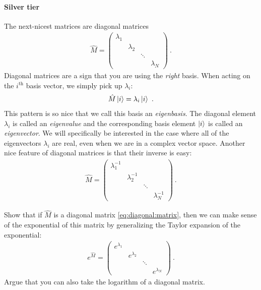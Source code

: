 \documentclass[12pt]{article}
\begin{document}
\paragraph{Silver tier} The next-nicest matrices are diagonal matrices
\begin{align}
\hat M = 
    \begin{pmatrix}
        \lambda_1 & & & \\
         & \lambda_2 & & \\
         & & \ddots & \\
         & & & \lambda_N
    \end{pmatrix} \ .
    \label{eq:diagonal:matrix}
\end{align}
Diagonal matrices are a sign that you are using the \emph{right} basis. When acting on the $i^\text{th}$ basis vector, we simply pick up $\lambda_i$:
\begin{align}
    \hat M \left|i\right\rangle = \lambda_i \left|i\right\rangle \ .
\end{align}
This pattern is so nice that we call this basis an \emph{eigenbasis}. The diagonal element $\lambda_i$ is called an \emph{eigenvalue} and the corresponding basis element $\left|i\right\rangle$ is called an \emph{eigenvector}. We will specifically be interested in the case where all of the eigenvectors $\lambda_i$ are real, even when we are in a complex vector space. Another nice feature of diagonal matrices is that their inverse is easy:
\begin{align}
    \hat M = 
        \begin{pmatrix}
        \lambda_1^{-1} & & & \\
         & \lambda_2^{-1} & & \\
         & & \ddots & \\
         & & & \lambda_N^{-1}
    \end{pmatrix} \ .
\end{align}


\begin{exercise}
Show that if $\hat M$ is a diagonal matrix \eqref{eq:diagonal:matrix}, then we can make sense of the exponential of this matrix by generalizing the Taylor expansion of the exponential:
\begin{align}
e^{\hat M} = 
    \begin{pmatrix}
        e^{\lambda_1} & & & \\
         & e^{\lambda_2} & & \\
         & & \ddots & \\
         & & & e^{\lambda_N}
    \end{pmatrix} \ .
    \label{eq:diagonal:matrix:exponential}
\end{align}
Argue that you can also take the logarithm of a diagonal matrix. 
\end{exercise}
\end{document}
